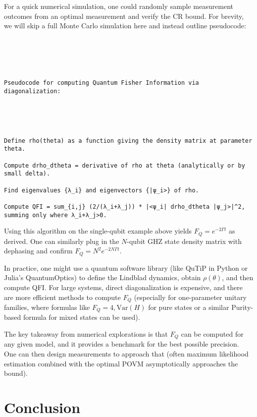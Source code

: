 For a quick numerical simulation, one could randomly sample
measurement outcomes from an optimal measurement and verify the CR
bound. For brevity, we will skip a full Monte Carlo simulation here
and instead outline pseudocode:



\begin{verbatim}





Pseudocode for computing Quantum Fisher Information via diagonalization:





Define rho(theta) as a function giving the density matrix at parameter theta.

Compute drho_dtheta = derivative of rho at theta (analytically or by small delta).

Find eigenvalues {λ_i} and eigenvectors {|ψ_i>} of rho.

Compute QFI = sum_{i,j} (2/(λ_i+λ_j)) * |<ψ_i| drho_dtheta |ψ_j>|^2, summing only where λ_i+λ_j>0.

\end{verbatim}



Using this algorithm on the single-qubit example above yields $F_Q =
e^{-2\Gamma t}$ as derived. One can similarly plug in the $N$-qubit
GHZ state density matrix with dephasing and confirm $F_Q = N^2
e^{-2N\Gamma t}$.



In practice, one might use a quantum software library (like QuTiP in
Python or Julia’s QuantumOptics) to define the Lindblad dynamics,
obtain $\rho(\theta)$, and then compute QFI. For large systems, direct
diagonalization is expensive, and there are more efficient methods to
compute $F_Q$ (especially for one-parameter unitary families, where
formulas like $F_Q = 4 , \text{Var}(H)$ for pure states or a similar
Purity-based formula for mixed states can be used).



The key takeaway from numerical explorations is that $F_Q$ can be
computed for any given model, and it provides a benchmark for the best
possible precision. One can then design measurements to approach that
(often maximum likelihood estimation combined with the optimal POVM
asymptotically approaches the bound).



\section{Conclusion}



